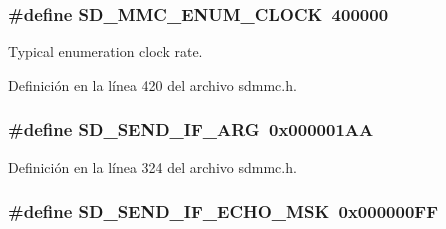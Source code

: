 \subsubsection[{\texorpdfstring{S\+D\+\_\+\+M\+M\+C\+\_\+\+E\+N\+U\+M\+\_\+\+C\+L\+O\+CK}{SD_MMC_ENUM_CLOCK}}]{\setlength{\rightskip}{0pt plus 5cm}\#define S\+D\+\_\+\+M\+M\+C\+\_\+\+E\+N\+U\+M\+\_\+\+C\+L\+O\+CK~400000}\hypertarget{group___c_h_i_p___s_d_m_m_c___definitions_ga495b4ec71ba467ec70b848dd658f0733}{}\label{group___c_h_i_p___s_d_m_m_c___definitions_ga495b4ec71ba467ec70b848dd658f0733}


Typical enumeration clock rate. 



Definición en la línea 420 del archivo sdmmc.\+h.

\subsubsection[{\texorpdfstring{S\+D\+\_\+\+S\+E\+N\+D\+\_\+\+I\+F\+\_\+\+A\+RG}{SD_SEND_IF_ARG}}]{\setlength{\rightskip}{0pt plus 5cm}\#define S\+D\+\_\+\+S\+E\+N\+D\+\_\+\+I\+F\+\_\+\+A\+RG~0x000001\+AA}\hypertarget{group___c_h_i_p___s_d_m_m_c___definitions_ga68165be37eead48db1f60d2a58f802c3}{}\label{group___c_h_i_p___s_d_m_m_c___definitions_ga68165be37eead48db1f60d2a58f802c3}


Definición en la línea 324 del archivo sdmmc.\+h.

\subsubsection[{\texorpdfstring{S\+D\+\_\+\+S\+E\+N\+D\+\_\+\+I\+F\+\_\+\+E\+C\+H\+O\+\_\+\+M\+SK}{SD_SEND_IF_ECHO_MSK}}]{\setlength{\rightskip}{0pt plus 5cm}\#define S\+D\+\_\+\+S\+E\+N\+D\+\_\+\+I\+F\+\_\+\+E\+C\+H\+O\+\_\+\+M\+SK~0x000000\+FF}\hypertarget{group___c_h_i_p___s_d_m_m_c___definitions_gaf88a2c05cd91f10749d2f712e91021c1}{}\label{group___c_h_i_p___s_d_m_m_c___definitions_gaf88a2c05cd91f10749d2f712e91021c1}


